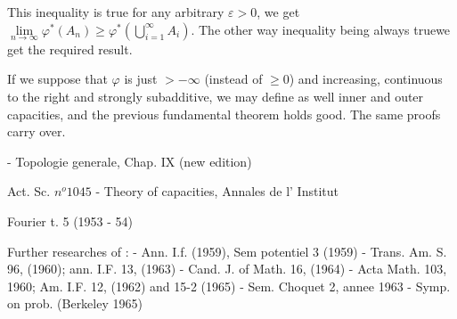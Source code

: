 This inequality is true for any arbitrary $\varepsilon > 0$, we get
$\lim\limits_{n \to \infty} \varphi^* (A_n) \ge \varphi^*
\left(\bigcup\limits^{\infty}_{i = 1} A_i\right)$. The other way
inequality being always true\pageoriginale we get the required result. 

\begin{remark*} %
  If we suppose that $\varphi$ is just $> -\infty $ (instead of $\ge
  0$) and increasing, continuous to the right and strongly
  subadditive, we may define as well inner and outer capacities, and
  the previous fundamental theorem holds good. The same proofs carry
  over. 
\end{remark*}

\begin{thebibliography}{99}
 - Topologie generale, Chap. IX (new edition)

  {}{} Act. Sc. $n^o 1045$
 - Theory of capacities, Annales de l' Institut

  {}{} Fourier t. 5 (1953 - 54)

\noindent
Further researches of : 
 - Ann. I.f. (1959), Sem potentiel 3 (1959)
 - Trans. Am. S. 96, (1960); ann. I.F. 13, (1963)
 - Cand. J. of Math. 16, (1964)
 - Acta Math. 103, 1960; Am. I.F. 12, (1962) and
  15-2 (1965) 
 - Sem. Choquet 2, annee 1963
 - Symp. on prob. (Berkeley 1965)
\end{thebibliography}
